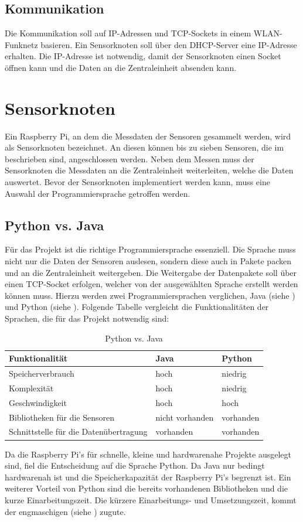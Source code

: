 \subsection{Kommunikation}
Die Kommunikation soll auf IP-Adressen und TCP-Sockets in einem WLAN-Funknetz basieren. Ein Sensorknoten soll über den \ac{DHCP}-Server eine IP-Adresse erhalten. Die IP-Adresse ist notwendig, damit der Sensorknoten einen Socket öffnen kann und die Daten an die Zentraleinheit absenden kann. 

\section{Sensorknoten}
Ein Raspberry Pi, an dem die Messdaten der Sensoren gesammelt werden, wird als Sensorknoten bezeichnet. An diesen können bis zu sieben Sensoren, die im  beschrieben sind, angeschlossen werden. Neben dem Messen muss der Sensorknoten die Messdaten an die Zentraleinheit weiterleiten, welche die Daten auswertet. Bevor der Sensorknoten implementiert werden kann, muss eine Auswahl der Programmiersprache getroffen werden.

\subsection{Python vs. Java}
Für das Projekt ist die richtige Programmiersprache essenziell. Die Sprache muss nicht nur die Daten der Sensoren auslesen, sondern diese auch in Pakete packen und an die Zentraleinheit weitergeben. Die Weitergabe der Datenpakete soll über einen TCP-Socket erfolgen, welcher von der ausgewählten Sprache erstellt werden können muss. Hierzu werden zwei Programmiersprachen verglichen, Java (siehe ) und Python (siehe ). Folgende Tabelle vergleicht die Funktionalitäten der Sprachen, die für das Projekt notwendig sind:\hfill

\begin{table}[htb]
	\centering
	\caption{Python vs. Java}
	\label{tab:phytionvsjava}
	\begin{tabular}{l|l|l}
	\textbf{Funktionalität} & \textbf{Java} &\textbf{Python}   \\
	\hline
	 Speicherverbrauch & hoch & niedrig \\\hline
	Komplexität  & hoch & niedrig\\\hline
	Geschwindigkeit  & hoch & hoch \\\hline
	Bibliotheken für die Sensoren & nicht vorhanden & vorhanden \\\hline
	Schnittstelle für die Datenübertragung & vorhanden & vorhanden
	\end{tabular}
\end{table}
\noindent Da die Raspberry Pi's für schnelle, kleine und hardwarenahe Projekte ausgelegt sind, fiel die Entscheidung auf die Sprache Python. Da Java nur bedingt hardwarenah ist und die Speicherkapazität der Raspberry Pi's begrenzt ist. Ein weiterer Vorteil von Python sind die bereits vorhandenen Bibliotheken und die kurze Einarbeitungszeit. Die kürzere Einarbeitungs- und Umsetzungszeit, kommt der engmaschigen  (siehe ) zugute.

